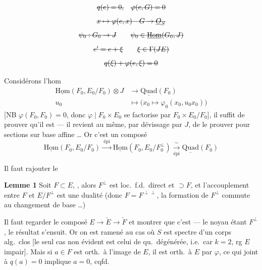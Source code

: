 \documentclass[11pt,a4paper]{article}
\begin{document}
\[
  \text{\struck{$q(e) = 0,$}} \quad \text{\struck{$\varphi(e, G) = 0$}}
\]
\[
  \text{\struck{$x \mapsto \varphi(e, x) \quad G \to \underline{O}_S$}}
\]
\[
  \text{\struck{$\psi_0 : G_0 \to J$}} \qquad
  \text{\struck{$\psi_0 \in \underline{\mathrm{Hom}}(G_0, J)$}}
\]
\[
  \text{\struck{$e' = e + \xi$}} \qquad \text{\struck{$\xi \in \Gamma(JE)$}}
\]
\[
  \text{\struck{$q(\xi) + \varphi(e, \xi) = 0$}}
\]

Considérons l'hom
\[
\begin{aligned}
  \underline{\mathrm{Hom}}(F_0, E_0/F_0) \otimes J &\longrightarrow \underline{\mathrm{Quad}}(F_0) \\
  u_0 &\longmapsto \bigl(x_0 \mapsto \varphi_0(x_0, u_0 x_0)\bigr)
\end{aligned}
\]
[NB $\varphi(F_0, F_0) = 0$, donc $\varphi \mid F_0 \times E_0$ se factorise par
$F_0 \times E_0/F_0$], il suffit de prouver qu'il est  — il revient
au même, par dévissage par $J$, de le prouver pour sections sur base affine …
Or c'est un composé
\[
  \underline{\mathrm{Hom}}(F_0, E_0/F_0) \xrightarrow{\ \text{épi}\ }
  \underline{\mathrm{Hom}}(F_0, E_0/F_0^{\perp}) \xrightarrow[\text{épi}]{\ \sim\ }
  \underline{\mathrm{Quad}}(F_0)
\]

Il faut rajouter le

\textbf{Lemme 1} Soit $F \subset E$, \struck{\ill{}} ,
alors $F^{\perp}$ est loc.\ f.d.\ direct et $\supset F$, et l'accouplement entre
$F$ et $E/F^{\perp}$ est une dualité (donc $F = F^{\perp\perp}$, la formation de
$F^{\perp}$ commute au changement de base …)

Il faut regarder \struck{\ill{}} le composé $E \to \check{E} \to \check{F}$ et
montrer que c'est   — le noyau étant $F^{\perp}$, le
résultat s'ensuit. Or on est ramené au cas où $S$ est spectre d'un corps
alg.\ clos [le seul cas non évident est celui de qu.\ dégénérée, i.e.\
car $k = 2$, rg $E$ impair]. Mais \struck{\uncertain{alors}, \uncertain{comme} $E \to \check{E}$ est
\uncertain{la}} si $a \in F$ est orth.\ à l'image de $E$, il est orth.\ à $E$ par $\varphi$,
\struck{donc} ce qui joint à $q(a) = 0$ implique $a = 0$, cqfd.
\end{document}
